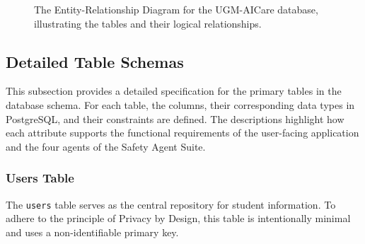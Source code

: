 \begin{figure}[h]
    \centering
    \caption{The Entity-Relationship Diagram for the UGM-AICare database, illustrating the tables and their logical relationships.}
    \label{fig:erd}
\end{figure}

\subsection{Detailed Table Schemas}

This subsection provides a detailed specification for the primary tables in the database schema. For each table, the columns, their corresponding data types in PostgreSQL, and their constraints are defined. The descriptions highlight how each attribute supports the functional requirements of the user-facing application and the four agents of the Safety Agent Suite.

\subsubsection{Users Table}
The \texttt{users} table serves as the central repository for student information. To adhere to the principle of Privacy by Design, this table is intentionally minimal and uses a non-identifiable primary key.

